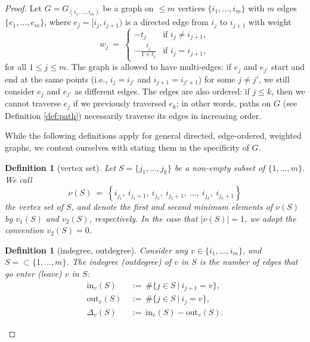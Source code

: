 \documentclass[12pt, reqno, oneside]{amsart}
\newtheorem{definition}[corollary]{Definition}
\numberwithin{equation}{section}
\begin{document}
\begin{proof}
Let $G = G_{(i_1, \dots, i_m)}$ be a graph on $\leq m$ vertices $\{i_1, \dots, i_m\}$ with $m$ edges $\{e_1, \dots, e_m\}$, where $e_j=[i_j,i_{j+1})$ is a directed edge from $i_j$ to $i_{j+1}$ with weight
\begin{equation}
w_j \ = \ 
\begin{cases}
-t_j & \text{if } i_j \neq i_{j+1}, \\
-\frac{t_j}{1+t_j} & \text{if } i_j = i_{j+1},
\end{cases}
\end{equation}
for all $1 \leq j \leq m$. The graph is allowed to have multi-edges: if $e_j$ and $e_{j'}$ start and end at the same points (i.e., $i_j = i_{j'}$ and $i_{j+1} = i_{j'+1}$) for some $j \neq j'$, we still consider $e_j$ and $e_{j'}$ as different edges. The edges are also ordered: if $j \leq k$, then we cannot traverse $e_j$ if we previously traversed $e_k$; in other words, paths on $G$ (see Definition \ref{def:path}) necessarily traverse its edges in increasing order. 

While the following definitions apply for general directed, edge-ordered, weighted graphs, we content ourselves with stating them in the specificity of $G$. 

\begin{definition}[vertex set]\label{def:vertex-set-main}
Let $S = \{j_1, \dots, j_k\}$ be a non-empty subset of $\{1, \dots, m\}$. We call \begin{equation}\label{eq:vertex-set-main}
\nu(S) \ = \ \left\{i_{j_1}, \ i_{j_1+1}, \ i_{j_2}, \ i_{j_2+1}, \ \dots, \ i_{j_k}, \ i_{j_k+1}\right\}
\end{equation} 
the \textit{vertex set of $S$}, and denote the first and second minimum elements of $\nu(S)$ by $v_1(S)$ and $v_2(S)$, respectively. In the case that $|\nu(S)| = 1$, we adopt the convention $v_2(S) = 0$. 
\end{definition}

\begin{definition}[indegree, outdegree]\label{def:diff-degree}
Consider any $v \in \{i_1, \dots, i_m\}$, and $S =  \subset \{1, \dots, m\}$. The indegree (outdegree) of $v$ in $S$ is the number of edges that go enter (leave) $v$ in $S$:
\begin{align}
\text{in}_v(S) \ &:= \ \# \{j \in S \ | \ i_{j+1} = v\}, \\
\text{out}_v(S) \ &:= \ \# \{j \in S \ | \ i_j = v\}, \\
\Delta_v(S) \ &:= \ \text{in}_v(S) - \text{out}_v(S). 
\end{align}
\end{definition}


\end{proof}
\end{document}
